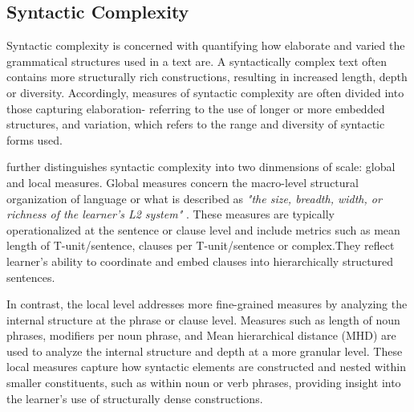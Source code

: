 
\subsection{Syntactic Complexity}


Syntactic complexity  is concerned with quantifying how elaborate and varied the grammatical structures used in a
    text are. A syntactically complex text often contains more structurally rich constructions, resulting in increased length, depth or diversity. Accordingly, measures of syntactic complexity are often divided into those capturing elaboration- referring to the use of
    longer or more embedded structures, and variation, which refers to the range and diversity of syntactic forms
    used.

\citet{Butle2012} further distinguishes syntactic complexity into two dinmensions of scale: global and local
measures. Global
measures concern the macro-level structural organization of language or what is described as
\textit{"the size, breadth, width, or richness of the
learner's L2 system"} \cite{Butle2012}. These measures are typically operationalized at the sentence or clause level
and include metrics such as mean length of T-unit/sentence, clauses per T-unit/sentence or complex.They reflect
learner's ability to coordinate and embed clauses into hierarchically structured sentences.

In contrast, the local level addresses more fine-grained measures by analyzing
the internal structure at the phrase or clause level. Measures such as length of noun phrases,
modifiers per noun phrase, and Mean hierarchical distance (MHD) are used to analyze the internal structure and depth
at a more granular level. These local measures capture how syntactic elements are constructed and nested within
smaller constituents, such as within noun or verb phrases, providing insight into the learner's use of structurally
dense constructions.

